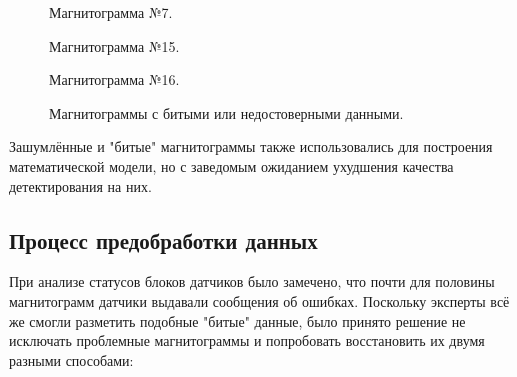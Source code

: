 \documentclass[a4paper,article,14pt]{extarticle}
\begin{document}
\begin{figure}[h!]
\begin{minipage}[h]{0.9\linewidth}
    \end{minipage}
    \vfill
    \begin{minipage}[h]{0.9\linewidth}
     Магнитограмма №7. \\
    \end{minipage}
    \vfill
    \begin{minipage}[h]{0.9\linewidth}
     Магнитограмма №15. \\
    \end{minipage}
    \vfill
    \begin{minipage}[h]{0.9\linewidth}
     Магнитограмма №16. \\
    \end{minipage}
    \caption{Магнитограммы с битыми или недостоверными данными.}
    \label{image6}
\end{figure}

Зашумлённые и "битые" магнитограммы также использовались для построения математической модели, но с заведомым ожиданием ухудшения качества детектирования на них.

\subsection{Процесс предобработки данных}

При анализе статусов блоков датчиков было замечено, что почти для половины магнитограмм 
датчики выдавали сообщения об ошибках. Поскольку эксперты всё же смогли разметить подобные "битые" 
данные, было принято решение не исключать проблемные магнитограммы и попробовать восстановить их двумя разными способами:
\end{document}
